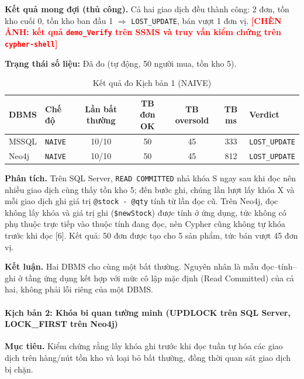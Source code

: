 \textbf{Kết quả mong đợi (thủ công).} Cả hai giao dịch đều thành công: 2 đơn, tồn kho cuối 0, tồn kho ban đầu 1 $\Rightarrow$ \texttt{LOST\_UPDATE}, bán vượt 1 đơn vị. \textcolor{red}{\textbf{[CHÈN ẢNH: kết quả \texttt{demo\_Verify} trên SSMS và truy vấn kiểm chứng trên \texttt{cypher-shell}]}}

\textbf{Trạng thái số liệu:} Đã đo (tự động, 50 người mua, tồn kho 5).

\begin{table}[htbp]
\centering
\caption{Kết quả đo Kịch bản 1 (NAIVE)}
\label{tab:tx-kb1}
\renewcommand{\arraystretch}{1.2}
\begin{tabularx}{\textwidth}{l l c c c c X}
\toprule
\textbf{DBMS} & \textbf{Chế độ} & \textbf{Lần bất thường} & \textbf{TB đơn OK} & \textbf{TB oversold} & \textbf{TB ms} & \textbf{Verdict} \\
\midrule
MSSQL & \texttt{NAIVE} & 10/10 & 50 & 45 & 333 & \texttt{LOST\_UPDATE} \\
Neo4j & \texttt{NAIVE} & 10/10 & 50 & 45 & 812 & \texttt{LOST\_UPDATE} \\
\bottomrule
\end{tabularx}
\end{table}

\textbf{Phân tích.} Trên SQL Server, \texttt{READ COMMITTED} nhả khóa S ngay sau khi đọc nên nhiều giao dịch cùng thấy tồn kho 5; đến bước ghi, chúng lần lượt lấy khóa X và mỗi giao dịch ghi giá trị \texttt{@stock - @qty} tính từ lần đọc cũ. Trên Neo4j, đọc không lấy khóa và giá trị ghi (\texttt{\$newStock}) được tính ở ứng dụng, tức không có phụ thuộc trực tiếp vào thuộc tính đang đọc, nên Cypher cũng không tự khóa trước khi đọc [6]. Kết quả: 50 đơn được tạo cho 5 sản phẩm, tức bán vượt 45 đơn vị.

\textbf{Kết luận.} Hai DBMS cho cùng một bất thường. Nguyên nhân là mẫu đọc--tính--ghi ở tầng ứng dụng kết hợp với mức cô lập mặc định (Read Committed) của cả hai, không phải lỗi riêng của một DBMS.

\paragraph{Kịch bản 2: Khóa bi quan tường minh (UPDLOCK trên SQL Server, LOCK\_FIRST trên Neo4j)}
\label{par:tx-kb2}\mbox{}

\textbf{Mục tiêu.} Kiểm chứng rằng lấy khóa ghi trước khi đọc tuần tự hóa các giao dịch trên hàng/nút tồn kho và loại bỏ bất thường, đồng thời quan sát giao dịch bị chặn.

